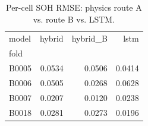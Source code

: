 \begin{table}
\caption{Per-cell SOH RMSE: physics route A vs. route B vs. LSTM.}
\label{tab:per_cell_rmse_routea_vs_b}
\begin{tabular}{lrrr}
\toprule
model & hybrid & hybrid\_B & lstm \\
fold &  &  &  \\
\midrule
B0005 & 0.0534 & 0.0506 & 0.0414 \\
B0006 & 0.0505 & 0.0268 & 0.0628 \\
B0007 & 0.0207 & 0.0120 & 0.0238 \\
B0018 & 0.0281 & 0.0273 & 0.0196 \\
\bottomrule
\end{tabular}
\end{table}
